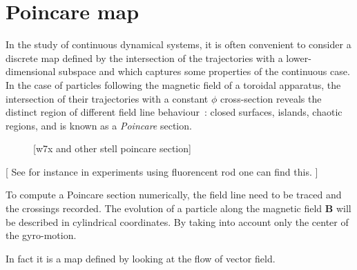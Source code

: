 \chapter{Poincare map}
\newcommand{\dpmap}{\mathcal{D}\mathcal{P}}
\newcommand{\pmap}{\mathcal{P}}
\newcommand{\nfp}{n_\text{fp}}
\newcommand{\z}{z}

In the study of continuous dynamical systems, it is often convenient to consider a discrete map defined by the intersection of the trajectories with a lower-dimensional subspace and which captures some properties of the continuous case. In the case of particles following the magnetic field of a toroidal apparatus, the intersection of their trajectories with a constant $\phi$ cross-section reveals the distinct region of different field line behaviour~: closed surfaces, islands, chaotic regions, and is known as a \textit{Poincare} section.

\begin{figure}[h!]
    \hfill
    \hfill
    \caption{[w7x and other stell poincare section]}
\end{figure}
[
See for instance 
in experiments using fluorencent rod one can find this.
]

To compute a Poincare section numerically, the field line need to be traced and the crossings recorded. The evolution of a particle along the magnetic field $\textbf{B}$ will be described in cylindrical coordinates. By taking into account only the center of the gyro-motion.

In fact it is a map defined by looking at the flow of vector field.

\noindent
{}

